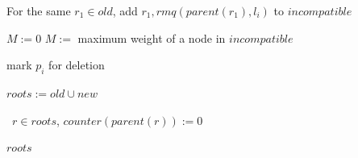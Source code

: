 \documentclass{article}
\newcommand{\weight}{\omega}
\begin{document}
\begin{algorithm}[ht]
\begin{algorithmic}[1]
                    \State For the same $r_1 \in old$, add $r_1, rmq(parent(r_1), l_i)$ to $incompatible$
                \EndIf

                    {$M := 0$}
                    $M :=$ maximum weight of a node in $incompatible$

                \IIf{$\weight(p_i) \leq M$}
                    mark $p_i$ for deletion

                \State $roots := old \cup new$
            \EndFor

            \State \algorithmicforall\ $r \in roots$, $counter(parent(r)) := 0$

            \State \Return $roots$
        \end{algorithmic}
    \end{algorithm}
\end{document}
